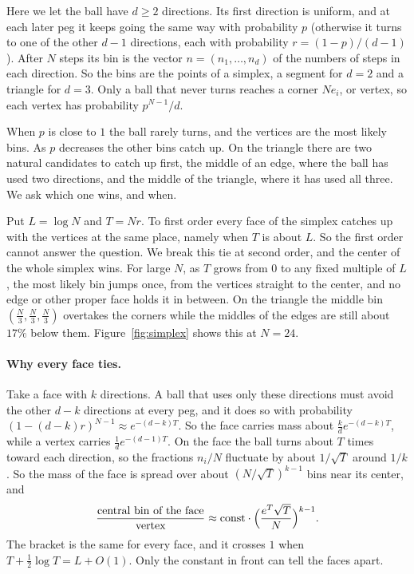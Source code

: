 \documentclass[11pt]{article}
\theoremstyle{definition}
\theoremstyle{remark}
\begin{document}
Here we let the ball have $d\ge2$ directions. Its first direction is uniform,
and at each later peg it keeps going the same way with probability $p$
(otherwise it turns to one of the other $d-1$ directions, each with
probability $r=(1-p)/(d-1)$). After $N$ steps its bin is the vector
$n=(n_1,\ldots,n_d)$ of the numbers of steps in each direction. So the bins are
the points of a simplex, a segment for $d=2$ and a triangle for $d=3$. Only a
ball that never turns reaches a corner $Ne_i$, or vertex, so each vertex has
probability $p^{N-1}/d$.

When $p$ is close to $1$ the ball rarely turns, and the vertices are the most
likely bins. As $p$ decreases the other bins catch up. On the triangle there
are two natural candidates to catch up first, the middle of an edge, where the
ball has used two directions, and the middle of the triangle, where it has used
all three. We ask which one wins, and when.

Put $L=\log N$ and $T=Nr$. To first order every face of the simplex catches up
with the vertices at the same place, namely when $T$ is about $L$. So the first
order cannot answer the question. We break this tie at second order, and the
center of the whole simplex wins. For large $N$, as $T$ grows from $0$ to any
fixed multiple of $L$, the most likely bin jumps once, from the vertices
straight to the center, and no edge or other proper face holds it in between. On
the triangle the middle bin $(\frac N3,\frac N3,\frac N3)$ overtakes the corners
while the middles of the edges are still about $17\%$ below them.
Figure~\ref{fig:simplex} shows this at $N=24$.

\paragraph{Why every face ties.}
Take a face with $k$ directions. A ball that uses only these directions must
avoid the other $d-k$ directions at every peg, and it does so with probability
$(1-(d-k)r)^{N-1}\approx e^{-(d-k)T}$. So the face carries mass about
$\frac kde^{-(d-k)T}$, while a vertex carries $\frac1de^{-(d-1)T}$. On the face
the ball turns about $T$ times toward each direction, so the fractions $n_i/N$
fluctuate by about $1/\sqrt T$ around $1/k$. So the mass of the face is
spread over about $(N/\sqrt T)^{k-1}$ bins near its center, and
\[
\frac{\text{central bin of the face}}{\text{vertex}}
\approx\text{const}\cdot\Bigl(\frac{e^T\sqrt T}N\Bigr)^{k-1}.
\]
The bracket is the same for every face, and it crosses $1$ when
$T+\frac12\log T=L+O(1)$. Only the constant in front can tell the faces apart.
\end{document}
